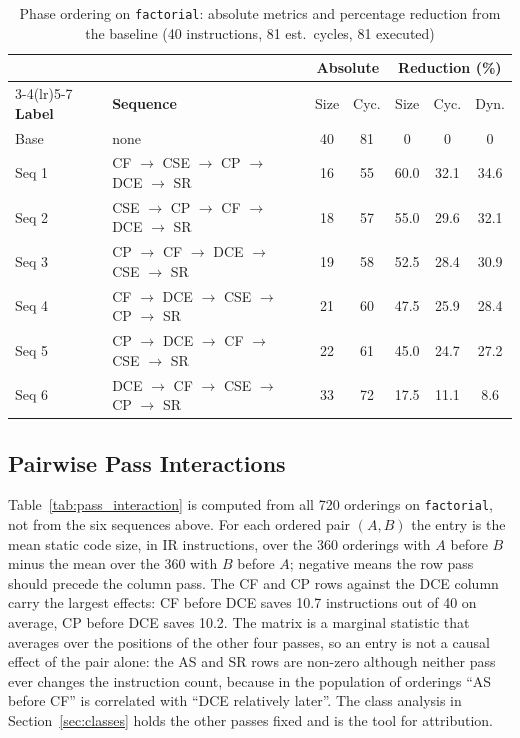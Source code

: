\documentclass[conference]{IEEEtran}
\begin{document}
\begin{table}[!htbp]
\centering
\caption{Phase ordering on \texttt{factorial}: absolute metrics and percentage reduction from the baseline (40 instructions, 81 est.\ cycles, 81 executed)}
\label{tab:phase_order_tradeoff}
\renewcommand{\arraystretch}{1.1}
{\footnotesize
\setlength{\tabcolsep}{2.6pt}
\begin{tabular}{@{}llccccc@{}}
\toprule
 & & \multicolumn{2}{c}{\textbf{Absolute}} & \multicolumn{3}{c}{\textbf{Reduction (\%)}} \\
\cmidrule(lr){3-4}\cmidrule(lr){5-7}
\textbf{Label} & \textbf{Sequence} & Size & Cyc. & Size & Cyc. & Dyn. \\
\midrule
Base  & none & 40 & 81 & 0 & 0 & 0 \\
Seq 1 & CF $\to$ CSE $\to$ CP $\to$ DCE $\to$ SR & 16 & 55 & 60.0 & 32.1 & 34.6 \\
Seq 2 & CSE $\to$ CP $\to$ CF $\to$ DCE $\to$ SR & 18 & 57 & 55.0 & 29.6 & 32.1 \\
Seq 3 & CP $\to$ CF $\to$ DCE $\to$ CSE $\to$ SR & 19 & 58 & 52.5 & 28.4 & 30.9 \\
Seq 4 & CF $\to$ DCE $\to$ CSE $\to$ CP $\to$ SR & 21 & 60 & 47.5 & 25.9 & 28.4 \\
Seq 5 & CP $\to$ DCE $\to$ CF $\to$ CSE $\to$ SR & 22 & 61 & 45.0 & 24.7 & 27.2 \\
Seq 6 & DCE $\to$ CF $\to$ CSE $\to$ CP $\to$ SR & 33 & 72 & 17.5 & 11.1 & 8.6 \\
\bottomrule
\end{tabular}
}
\end{table}

\subsection{Pairwise Pass Interactions}
\label{sec:interaction}
Table~\ref{tab:pass_interaction} is computed from all 720 orderings on \texttt{factorial}, not from the six sequences above. For each ordered pair $(A, B)$ the entry is the mean static code size, in IR instructions, over the 360 orderings with $A$ before $B$ minus the mean over the 360 with $B$ before $A$; negative means the row pass should precede the column pass. The CF and CP rows against the DCE column carry the largest effects: CF before DCE saves 10.7 instructions out of 40 on average, CP before DCE saves 10.2. The matrix is a marginal statistic that averages over the positions of the other four passes, so an entry is not a causal effect of the pair alone: the AS and SR rows are non-zero although neither pass ever changes the instruction count, because in the population of orderings ``AS before CF'' is correlated with ``DCE relatively later''. The class analysis in Section~\ref{sec:classes} holds the other passes fixed and is the tool for attribution.
\end{document}
